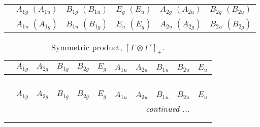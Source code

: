 \documentclass[fleqn,10pt,landscape]{article}
\begin{document}
\begin{itemize}
\begin{center}
\begin{longtable}{cccccc}
 & $ A_{1g}\,\,(A_{1u}) $ & $ B_{1g}\,\,(B_{1u}) $ & $ E_{g}\,\,(E_{u}) $ & $ A_{2g}\,\,(A_{2u}) $ & $ B_{2g}\,\,(B_{2u}) $ \\
& $ A_{1u}\,\,(A_{1g}) $ & $ B_{1u}\,\,(B_{1g}) $ & $ E_{u}\,\,(E_{g}) $ & $ A_{2u}\,\,(A_{2g}) $ & $ B_{2u}\,\,(B_{2g}) $ \\
\end{longtable}
\end{center}
\begin{center}
\renewcommand{\arraystretch}{1.0}
\begin{longtable}{c|cccccccccc}
\caption{Symmetric product, $[\Gamma\otimes\Gamma']_+.$}
 \\
 \hline \hline
 & $ A_{1g} $ & $ A_{2g} $ & $ B_{1g} $ & $ B_{2g} $ & $ E_{g} $ & $ A_{1u} $ & $ A_{2u} $ & $ B_{1u} $ & $ B_{2u} $ & $ E_{u} $ \\ \hline \endfirsthead

\multicolumn{10}{l}{\tablename\ \thetable{}} \\
 \hline \hline
 & $ A_{1g} $ & $ A_{2g} $ & $ B_{1g} $ & $ B_{2g} $ & $ E_{g} $ & $ A_{1u} $ & $ A_{2u} $ & $ B_{1u} $ & $ B_{2u} $ & $ E_{u} $ \\ \hline \endhead

 \hline \hline
\multicolumn{10}{r}{\footnotesize\it continued ...} \\ \endfoot

 \hline \hline
\multicolumn{10}{r}{} \\ \endlastfoot


\end{longtable}
\end{center}
\end{itemize}
\end{document}
